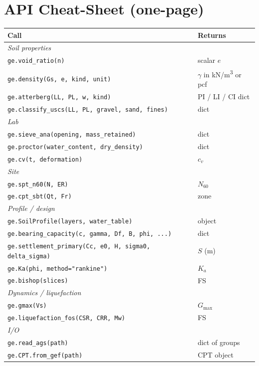 \documentclass[11pt,a4paper,openany]{book}
\newcommand{\code}[1]{\texttt{#1}}
\newcommand{\Gmax}{G_{\text{max}}}
\begin{document}
\chapter{API Cheat-Sheet (one-page)}

\renewcommand{\arraystretch}{1.15}
\begin{longtable}{p{}p{}}\toprule
\textbf{Call} & \textbf{Returns}\\\midrule
\endhead
\multicolumn{2}{l}{\textit{Soil properties}}\\
\code{ge.void\_ratio(n)} & scalar $e$\\
\code{ge.density(Gs, e, kind, unit)} & $\gamma$ in kN/m\textsuperscript{3} or pcf\\
\code{ge.atterberg(LL, PL, w, kind)} & PI / LI / CI dict\\
\code{ge.classify\_uscs(LL, PL, gravel, sand, fines)} & dict\\\midrule
\multicolumn{2}{l}{\textit{Lab}}\\
\code{ge.sieve\_ana(opening, mass\_retained)} & dict\\
\code{ge.proctor(water\_content, dry\_density)} & dict\\
\code{ge.cv(t, deformation)} & $c_v$\\\midrule
\multicolumn{2}{l}{\textit{Site}}\\
\code{ge.spt\_n60(N, ER)} & $N_{60}$\\
\code{ge.cpt\_sbt(Qt, Fr)} & zone\\\midrule
\multicolumn{2}{l}{\textit{Profile / design}}\\
\code{ge.SoilProfile(layers, water\_table)} & object\\
\code{ge.bearing\_capacity(c, gamma, Df, B, phi, ...)} & dict\\
\code{ge.settlement\_primary(Cc, e0, H, sigma0, delta\_sigma)} & $S$ (m)\\
\code{ge.Ka(phi, method="rankine")} & $K_a$\\
\code{ge.bishop(slices)} & FS\\\midrule
\multicolumn{2}{l}{\textit{Dynamics / liquefaction}}\\
\code{ge.gmax(Vs)} & $\Gmax$\\
\code{ge.liquefaction\_fos(CSR, CRR, Mw)} & FS\\\midrule
\multicolumn{2}{l}{\textit{I/O}}\\
\code{ge.read\_ags(path)} & dict of groups\\
\code{ge.CPT.from\_gef(path)} & CPT object\\
\bottomrule
\end{longtable}
\end{document}
